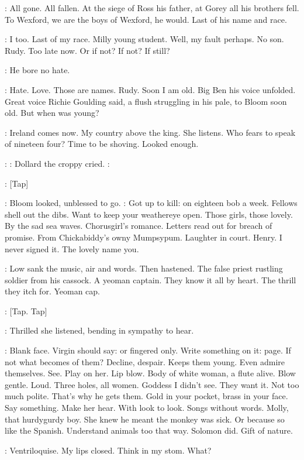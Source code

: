 \BloomInt:
All gone.
All fallen.
At the siege of Ross his father,
at Gorey all his
brothers fell.
To Wexford,
we are the boys of Wexford,
he would.
Last of
his name and race.

\BloomInt:
I too.
Last of my race.
Milly young student.
Well,
my fault perhaps.
No son.
Rudy.
Too late now.
Or if not?
If not?
If still?

\BloomInt:
He bore no hate.

\BloomInt:
Hate.
Love.
Those are names.
Rudy.
Soon I am old.
Big Ben his voice
unfolded.
Great voice Richie Goulding said,
a flush struggling in his
pale,
to Bloom soon old.
But when was young?

\BloomInt:
Ireland comes now.
My country above the king.
She listens.
Who
fears to speak of nineteen four?
Time to be shoving.
Looked enough.

\dollard:
:
Dollard the croppy cried.
\dollard:

\stripling:
[Tap]

:
Bloom looked,
unblessed to go.
\BloomInt:
Got up to kill:
on eighteen bob a
week.
Fellows shell out the dibs.
Want to keep your weathereye open.
Those
girls,
those lovely.
By the sad sea waves.
Chorusgirl's romance.
Letters
read out for breach of promise.
From Chickabiddy's owny Mumpsypum.
Laughter in court.
Henry.
I never signed it.
The lovely name you.

:
Low sank the music,
air and words.
Then hastened.
The false priest
rustling soldier from his cassock.
A yeoman captain.
They know it all by
heart.
The thrill they itch for.
Yeoman cap.

\stripling:
[Tap.
Tap]

:
Thrilled she listened,
bending in sympathy to hear.

\BloomInt:
Blank face.
Virgin should say:
or fingered only.
Write something on
it:
page.
If not what becomes of them?
Decline,
despair.
Keeps them young.
Even admire themselves.
See.
Play on her.
Lip blow.
Body of white woman,
a flute alive.
Blow gentle.
Loud.
Three holes,
all women.
Goddess I didn't
see.
They want it.
Not too much polite.
That's why he gets them.
Gold in
your pocket,
brass in your face.
Say something.
Make her hear.
With look
to look.
Songs without words.
Molly,
that hurdygurdy boy.
She knew he
meant the monkey was sick.
Or because so like the Spanish.
Understand
animals too that way.
Solomon did.
Gift of nature.

\BloomInt:
Ventriloquise.
My lips closed.
Think in my stom.
What?

